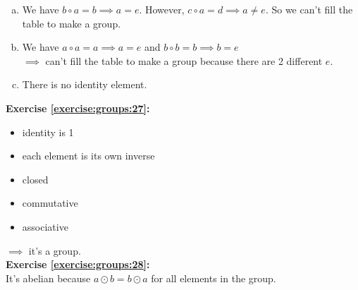 %
%
\begin{enumerate}[(a)]
\item
We have $b\circ a=b\implies a=e$. However, $c\circ a=d\implies a\neq e$.
So we can't fill the table to make a group.

\item
 We have $a\circ a=a\implies a=e$ and $b\circ b=b\implies b=e$\\
$\implies$  can't fill the table to make a group because there are 2 different $e$.

\item
There is no identity element.
\end{enumerate}

\noindent\textbf{Exercise \ref{exercise:groups:27}:}
\begin{itemize}
\item
identity is 1

\item
each element is its own inverse

\item
closed

\item
commutative

\item
associative

\end{itemize}
\noindent
$\implies$  it's a group.
\\

\noindent\textbf{Exercise \ref{exercise:groups:28}:}
\\
It's abelian because $a\odot b=b\odot a$ for all elements in the group.
\\

